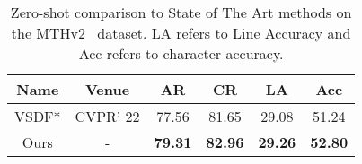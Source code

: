 \begin{table}[]
    \centering
    \caption{Zero-shot comparison to State of The Art methods on the MTHv2~\cite{jla} dataset. LA refers to Line Accuracy and Acc refers to character accuracy.}
    \begin{tabular}{c|c|c|ccc}
        \hline
         Name & Venue & AR & \textbf{CR} & LA & Acc \\
         \hline
         VSDF*\cite{vsdf}& CVPR' 22  &77.56 &81.65 &29.08 & 51.24 \\
         \hline
         Ours&- & \textbf{79.31} &\textbf{82.96}  & \textbf{29.26} & \textbf{52.80} \\
        \hline
    \end{tabular}
    \label{tab:zero_shot}
\end{table}